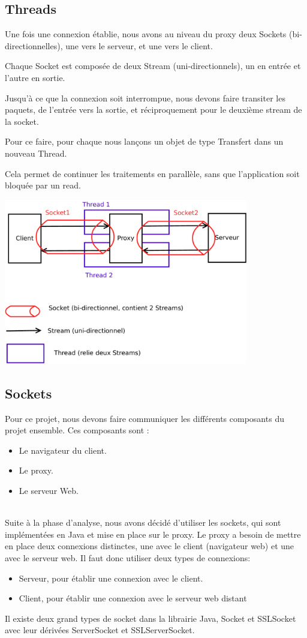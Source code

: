 \documentclass[a4paper,11pt,french]{report}
\begin{document}
\subsection{Threads}

Une fois une connexion établie, nous avons au niveau du proxy deux Sockets (bi-directionnelles), une vers le serveur, et une vers le client.

Chaque Socket est composée de deux Stream (uni-directionnels), un en entrée et l'autre en sortie.

Jusqu'à ce que la connexion soit interrompue, nous devons faire transiter les paquets, de l'entrée vers la sortie, et réciproquement pour le deuxième stream de la socket.

Pour ce faire, pour chaque nous lançons un objet de type Transfert dans un nouveau Thread.

Cela permet de continuer les traitements en parallèle, sans que l'application soit bloquée par un read.

\includegraphics[width=0.8\textwidth]{images/thread.pdf}

\subsection{Sockets}
Pour ce projet, nous devons faire communiquer les différents composants du projet ensemble. Ces composants sont :
\begin{itemize}
\item Le navigateur du client.
\item Le proxy.
\item Le serveur Web.
\end{itemize}
~~\\

Suite à la phase d'analyse, nous avons décidé d'utiliser les sockets, qui sont implémentées en Java 
et mise en place sur le proxy. Le proxy a besoin de mettre en place deux 
connexions distinctes, une avec le client (navigateur web) et une avec le serveur web. Il faut donc utiliser 
deux types de connexions:
\begin{itemize}
  \item Serveur, pour établir une connexion avec le client.
  \item Client, pour établir une connexion avec le serveur web distant
\end{itemize}
Il existe deux grand types de socket dans la librairie Java, Socket et SSLSocket 
avec leur dérivées ServerSocket et SSLServerSocket.
~~\\
\end{document}
